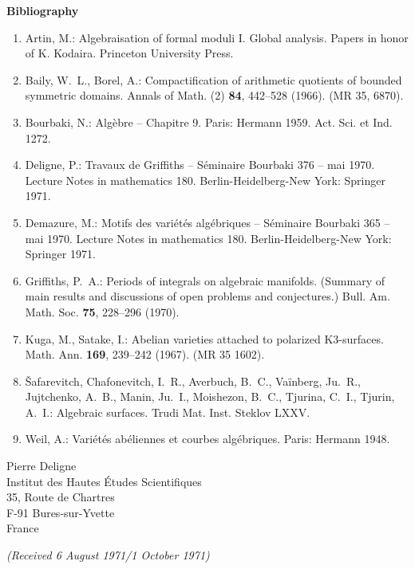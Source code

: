 \documentclass[10pt,leqno]{article}
\begin{document}
\begin{center}
\bfseries Bibliography
\end{center}
\begin{enumerate}[label=\arabic*.]
\item Artin, M.: Algebraisation of formal moduli I. Global analysis. Papers in honor of K. Kodaira. Princeton University Press.
\item Baily, W.~L., Borel, A.: Compactification of arithmetic quotients of bounded symmetric domains. Annals of Math. (2) \textbf{84}, 442--528 (1966). (MR 35, 6870).
\item Bourbaki, N.: Algèbre -- Chapitre 9. Paris: Hermann 1959. Act. Sci. et Ind. 1272.
\item Deligne, P.: Travaux de Griffiths -- Séminaire Bourbaki 376 -- mai 1970. Lecture Notes in mathematics 180. Berlin-Heidelberg-New York: Springer 1971.
\item Demazure, M.: Motifs des variétés algébriques -- Séminaire Bourbaki 365 -- mai 1970. Lecture Notes in mathematics 180. Berlin-Heidelberg-New York: Springer 1971.
\item Griffiths, P.~A.: Periods of integrals on algebraic manifolds. (Summary of main results and discussions of open problems and conjectures.) Bull. Am. Math. Soc. \textbf{75}, 228--296 (1970).
\item Kuga, M., Satake, I.: Abelian varieties attached to polarized K3-surfaces. Math. Ann. \textbf{169}, 239--242 (1967). (MR 35 1602).
\item \v{S}afarevitch, Chafonevitch, I.~R., Averbuch, B.~C., Va\"inberg, Ju.~R., Jujtchenko, A.~B., Manin, Ju.~I., Moishezon, B.~C., Tjurina, C.~I., Tjurin, A.~I.: Algebraic surfaces. Trudi Mat. Inst. Steklov LXXV.
\item Weil, A.: Variétés abéliennes et courbes algébriques. Paris: Hermann 1948.
\end{enumerate}

\begin{flushright}
Pierre Deligne\\
Institut des Hautes Études Scientifiques\\
35, Route de Chartres\\
F-91 Bures-sur-Yvette\\
France
\end{flushright}

\begin{center}
\emph{(Received 6 August 1971/1 October 1971)}
\end{center}
\end{document}
